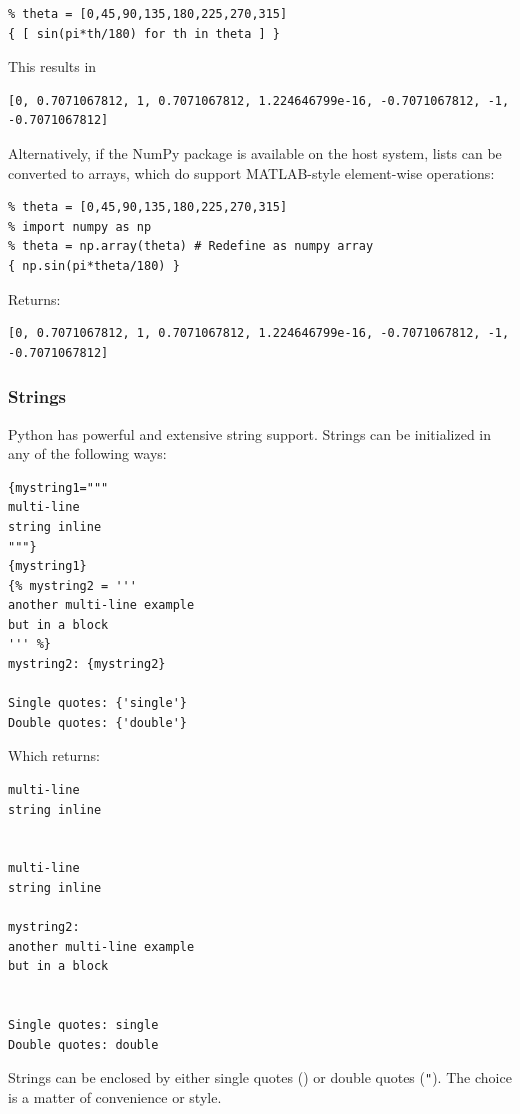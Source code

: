 {\begin{verbatim}
% theta = [0,45,90,135,180,225,270,315] 
{ [ sin(pi*th/180) for th in theta ] }
\end{verbatim}

This results in

\begin{verbatim}
[0, 0.7071067812, 1, 0.7071067812, 1.224646799e-16, -0.7071067812, -1, -0.7071067812]
\end{verbatim}

Alternatively, if the NumPy package is available on the host system, lists can be 
converted to arrays, which do support MATLAB-style element-wise operations:

\begin{verbatim}
% theta = [0,45,90,135,180,225,270,315]
% import numpy as np
% theta = np.array(theta) # Redefine as numpy array
{ np.sin(pi*theta/180) }
\end{verbatim}

Returns:

\begin{verbatim}
[0, 0.7071067812, 1, 0.7071067812, 1.224646799e-16, -0.7071067812, -1, -0.7071067812]
\end{verbatim}

\subsubsection{Strings}\label{interfaces:strings}

Python has powerful and extensive string support. Strings can be initialized 
in any of the following ways:

\begin{verbatim}
{mystring1="""
multi-line
string inline
"""}
{mystring1}
{% mystring2 = '''
another multi-line example
but in a block
''' %}
mystring2: {mystring2}

Single quotes: {'single'}
Double quotes: {'double'}
\end{verbatim}

Which returns:

\begin{verbatim}
multi-line
string inline


multi-line
string inline

mystring2:
another multi-line example
but in a block


Single quotes: single
Double quotes: double
\end{verbatim}

Strings can be enclosed by either single quotes (\texttt{\textquotesingle{}}) 
or double quotes (\texttt{"}). The choice is a matter of convenience or style.

}
